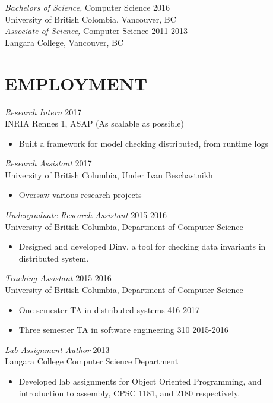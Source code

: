 \documentclass[line,margin]{res}
\begin{document}
\begin{resume}
{\sl Bachelors of Science,} Computer Science	\hfill 2016\\
University of British Colombia, Vancouver, BC \\

{\sl Associate of Science,} Computer Science \hfill 2011-2013\\
Langara College, Vancouver, BC\\


\section{EMPLOYMENT} 
{\sl Research Intern} \hfill 2017\\
    INRIA Rennes 1, ASAP (As scalable as possible)
\begin{itemize} \itemsep -2pt
        \item Built a framework for model checking distributed, from runtime logs
    \end{itemize}
{\sl Research Assistant} \hfill 2017\\
    University of British Columbia, Under Ivan Beschastnikh
\begin{itemize} \itemsep -2pt
        \item Oversaw various research projects
    \end{itemize}
{\sl Undergraduate Research Assistant} \hfill 2015-2016\\
	University of British Columbia, Department of Computer Science
\begin{itemize} \itemsep -2pt
        \item Designed and developed Dinv, a tool for checking data invariants in distributed system.
    \end{itemize}
{\sl Teaching Assistant} \hfill 2015-2016\\
	University of British Columbia, Department of Computer Science
\begin{itemize} \itemsep -2pt
        \item One semester TA in distributed systems 416 \hfill 2017
		\item Three semester TA in software engineering 310 \hfill 2015-2016\\
	\end{itemize}
{\sl Lab Assignment Author} \hfill 2013\\
	Langara College Computer Science Department
	\begin{itemize} \itemsep -2pt
			\item Developed lab assignments for Object Oriented Programming, and introduction to assembly, CPSC 1181, and 2180 respectively.
	\end{itemize}
    


\end{resume}
\end{document}
